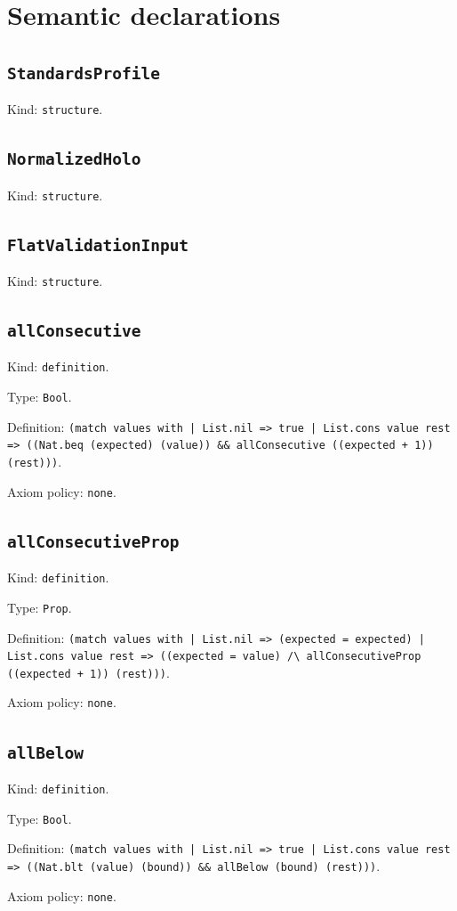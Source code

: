 \documentclass[11pt]{article}
\begin{document}
\section*{Semantic declarations}
\subsection*{\texttt{StandardsProfile}}
\noindent Kind: \texttt{structure}.\par
\subsection*{\texttt{NormalizedHolo}}
\noindent Kind: \texttt{structure}.\par
\subsection*{\texttt{FlatValidationInput}}
\noindent Kind: \texttt{structure}.\par
\subsection*{\texttt{allConsecutive}}
\noindent Kind: \texttt{definition}.\par
\noindent Type: \texttt{Bool}.\par
\noindent Definition: \texttt{(match values with | List.nil => true | List.cons value rest => ((Nat.beq (expected) (value)) \&\& allConsecutive ((expected + 1)) (rest)))}.\par
\noindent Axiom policy: \texttt{none}.\par
\subsection*{\texttt{allConsecutiveProp}}
\noindent Kind: \texttt{definition}.\par
\noindent Type: \texttt{Prop}.\par
\noindent Definition: \texttt{(match values with | List.nil => (expected = expected) | List.cons value rest => ((expected = value) /\textbackslash{} allConsecutiveProp ((expected + 1)) (rest)))}.\par
\noindent Axiom policy: \texttt{none}.\par
\subsection*{\texttt{allBelow}}
\noindent Kind: \texttt{definition}.\par
\noindent Type: \texttt{Bool}.\par
\noindent Definition: \texttt{(match values with | List.nil => true | List.cons value rest => ((Nat.blt (value) (bound)) \&\& allBelow (bound) (rest)))}.\par
\noindent Axiom policy: \texttt{none}.\par
\end{document}
